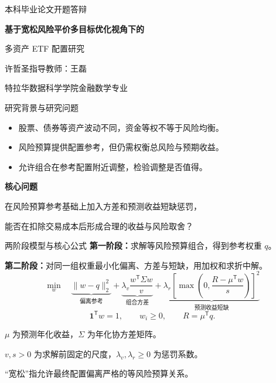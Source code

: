 \documentclass[aspectratio=169,12pt]{beamer}
\begin{document}
\begin{frame}
  \vspace{7mm}
  {\color{Navy}\small 本科毕业论文开题答辩\par}
  \vspace{6mm}
  {\color{Navy}\LARGE\bfseries 基于宽松风险平价多目标优化视角下的\par 多资产 ETF 配置研究\par}
  \vspace{8mm}
  {\normalsize 许哲圣\qquad 指导教师：王磊\par}
  {\small 特拉华数据科学学院\quad 金融数学专业\par}
  \vspace{2mm}
  
\end{frame}

\begin{frame}{研究背景与研究问题}
  \begin{itemize}
    \setlength{\itemsep}{10pt}
    \item 股票、债券等资产波动不同，资金等权不等于风险均衡。
    \item 风险预算提供配置参考，但仍需权衡总风险与预期收益。
    \item 允许组合在参考配置附近调整，检验调整是否值得。
  \end{itemize}
  \vspace{6mm}
  {\color{Navy}\bfseries 核心问题\par}
  在风险预算参考基础上加入方差和预测收益短缺惩罚，\par
  能否在扣除交易成本后形成合理的收益与风险取舍？
\end{frame}

\begin{frame}{两阶段模型与核心公式}
  \textbf{第一阶段：}求解等风险预算组合，得到参考权重 $q$。\par
  \textbf{第二阶段：}对同一组权重最小化偏离、方差与短缺，用加权和求折中解。
  \vspace{1mm}
  \[
    \min_w\quad
    \underbrace{\lVert w-q\rVert_2^2}_{\text{偏离参考}}
    +\underbrace{\lambda_v\frac{w^{\mathsf T}\Sigma w}{v}}_{\text{组合方差}}
    +\underbrace{\lambda_r\!\left[\max\!\left(0,\frac{R-\mu^{\mathsf T}w}{s}\right)\right]^2}_{\text{预测收益短缺}}
  \]
  \[
    \mathbf{1}^{\mathsf T}w=1,\qquad w_i\geq 0,\qquad R=\mu^{\mathsf T}q.
  \]
  {\small
    $\mu$ 为预测年化收益，$\Sigma$ 为年化协方差矩阵。\par
    $v,s>0$ 为求解前固定的尺度，$\lambda_v,\lambda_r\geq0$ 为惩罚系数。\par
  }
  \vspace{2mm}
  {\color{Navy}“宽松”指允许最终配置偏离严格的等风险预算关系。}
\end{frame}
\end{document}
